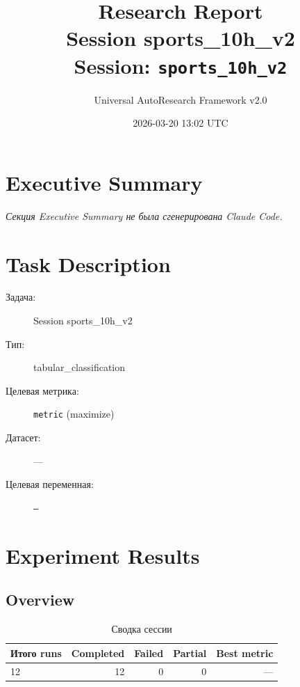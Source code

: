 \documentclass[12pt,a4paper]{article}
\title{
    \Large\textbf{Research Report}\\[0.5em]
    \large Session sports\_10h\_v2\\[0.3em]
    \normalsize Session: \texttt{sports\_10h\_v2}
}
\author{Universal AutoResearch Framework v2.0}
\date{2026-03-20 13:02 UTC}
\begin{document}
\maketitle
\tableofcontents
\newpage


\section{Executive Summary}

\textit{Секция Executive Summary не была сгенерирована Claude Code.}



\section{Task Description}

\begin{description}
    \item[Задача:] Session sports\_10h\_v2
    \item[Тип:] tabular\_classification
    \item[Целевая метрика:] \texttt{metric}
        (maximize)
    \item[Датасет:] ---
    \item[Целевая переменная:] \texttt{---}
\end{description}




\section{Experiment Results}

\subsection{Overview}

\begin{table}[H]
\centering
\caption{Сводка сессии}
\begin{tabular}{lrrrr}
\toprule
Итого runs & Completed & Failed & Partial & Best metric \\
\midrule
12 & \textcolor{passcolor}{12}
    & \textcolor{failcolor}{0}
    & \textcolor{partialcolor}{0}
    & --- \\
\bottomrule
\end{tabular}
\end{table}
\end{document}
